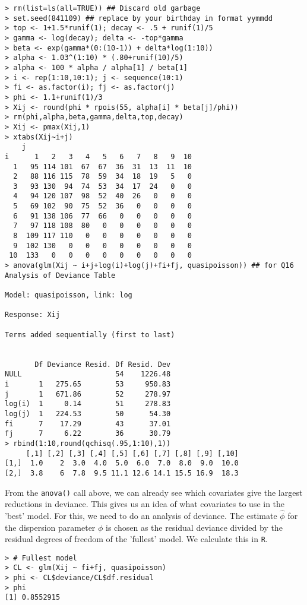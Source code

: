 \documentclass[11pt]{article}
\begin{document}
\begin{verbatim}
> rm(list=ls(all=TRUE)) ## Discard old garbage
> set.seed(841109) ## replace by your birthday in format yymmdd
> top <- 1+1.5*runif(1); decay <- .5 + runif(1)/5
> gamma <- log(decay); delta <- -top*gamma
> beta <- exp(gamma*(0:(10-1)) + delta*log(1:10))
> alpha <- 1.03^(1:10) * (.80+runif(10)/5)
> alpha <- 100 * alpha / alpha[1] / beta[1]
> i <- rep(1:10,10:1); j <- sequence(10:1)
> fi <- as.factor(i); fj <- as.factor(j)
> phi <- 1.1+runif(1)/3
> Xij <- round(phi * rpois(55, alpha[i] * beta[j]/phi))
> rm(phi,alpha,beta,gamma,delta,top,decay)
> Xij <- pmax(Xij,1)
> xtabs(Xij~i+j)
    j
i      1   2   3   4   5   6   7   8   9  10
  1   95 114 101  67  67  36  31  13  11  10
  2   88 116 115  78  59  34  18  19   5   0
  3   93 130  94  74  53  34  17  24   0   0
  4   94 120 107  98  52  40  26   0   0   0
  5   69 102  90  75  52  36   0   0   0   0
  6   91 138 106  77  66   0   0   0   0   0
  7   97 118 108  80   0   0   0   0   0   0
  8  109 117 110   0   0   0   0   0   0   0
  9  102 130   0   0   0   0   0   0   0   0
 10  133   0   0   0   0   0   0   0   0   0
> anova(glm(Xij ~ i+j+log(i)+log(j)+fi+fj, quasipoisson)) ## for Q16
Analysis of Deviance Table

Model: quasipoisson, link: log

Response: Xij

Terms added sequentially (first to last)


       Df Deviance Resid. Df Resid. Dev
NULL                      54    1226.48
i       1   275.65        53     950.83
j       1   671.86        52     278.97
log(i)  1     0.14        51     278.83
log(j)  1   224.53        50      54.30
fi      7    17.29        43      37.01
fj      7     6.22        36      30.79
> rbind(1:10,round(qchisq(.95,1:10),1))
     [,1] [,2] [,3] [,4] [,5] [,6] [,7] [,8] [,9] [,10]
[1,]  1.0    2  3.0  4.0  5.0  6.0  7.0  8.0  9.0  10.0
[2,]  3.8    6  7.8  9.5 11.1 12.6 14.1 15.5 16.9  18.3
\end{verbatim}

From the \verb|anova()| call above, we can already see which covariates give the largest reductions in deviance. This gives us an idea of what covariates to use in the 'best' model. For this, we need to do an analysis of deviance. The estimate $\hat{\phi}$ for the dispersion parameter $\phi$ is chosen as the residual deviance divided by the residual degrees of freedom of the 'fullest' model. We calculate this in \verb|R|.

\begin{verbatim}
> # Fullest model
> CL <- glm(Xij ~ fi+fj, quasipoisson)
> phi <- CL$deviance/CL$df.residual
> phi
[1] 0.8552915
\end{verbatim}
\end{document}
